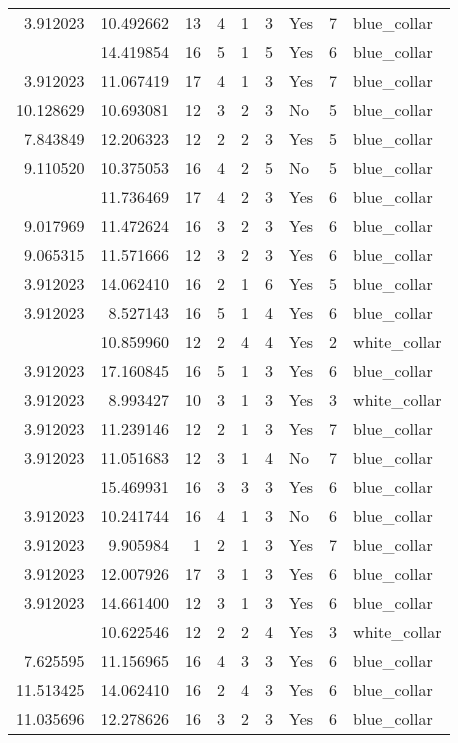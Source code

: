 \documentclass[
]{article}
\begin{document}
\begin{longtable}[t]{rrrrrllrl}
3.912023 & 10.492662 & 13 & 4 & 1 & 3 & Yes & 7 & blue\_collar\\
\addlinespace
3.912023 & 14.419854 & 16 & 5 & 1 & 5 & Yes & 6 & blue\_collar\\
3.912023 & 11.067419 & 17 & 4 & 1 & 3 & Yes & 7 & blue\_collar\\
10.128629 & 10.693081 & 12 & 3 & 2 & 3 & No & 5 & blue\_collar\\
7.843849 & 12.206323 & 12 & 2 & 2 & 3 & Yes & 5 & blue\_collar\\
9.110520 & 10.375053 & 16 & 4 & 2 & 5 & No & 5 & blue\_collar\\
\addlinespace
8.022897 & 11.736469 & 17 & 4 & 2 & 3 & Yes & 6 & blue\_collar\\
9.017969 & 11.472624 & 16 & 3 & 2 & 3 & Yes & 6 & blue\_collar\\
9.065315 & 11.571666 & 12 & 3 & 2 & 3 & Yes & 6 & blue\_collar\\
3.912023 & 14.062410 & 16 & 2 & 1 & 6 & Yes & 5 & blue\_collar\\
3.912023 & 8.527143 & 16 & 5 & 1 & 4 & Yes & 6 & blue\_collar\\
\addlinespace
7.207860 & 10.859960 & 12 & 2 & 4 & 4 & Yes & 2 & white\_collar\\
3.912023 & 17.160845 & 16 & 5 & 1 & 3 & Yes & 6 & blue\_collar\\
3.912023 & 8.993427 & 10 & 3 & 1 & 3 & Yes & 3 & white\_collar\\
3.912023 & 11.239146 & 12 & 2 & 1 & 3 & Yes & 7 & blue\_collar\\
3.912023 & 11.051683 & 12 & 3 & 1 & 4 & No & 7 & blue\_collar\\
\addlinespace
12.657307 & 15.469931 & 16 & 3 & 3 & 3 & Yes & 6 & blue\_collar\\
3.912023 & 10.241744 & 16 & 4 & 1 & 3 & No & 6 & blue\_collar\\
3.912023 & 9.905984 & 1 & 2 & 1 & 3 & Yes & 7 & blue\_collar\\
3.912023 & 12.007926 & 17 & 3 & 1 & 3 & Yes & 6 & blue\_collar\\
3.912023 & 14.661400 & 12 & 3 & 1 & 3 & Yes & 6 & blue\_collar\\
\addlinespace
4.094345 & 10.622546 & 12 & 2 & 2 & 4 & Yes & 3 & white\_collar\\
7.625595 & 11.156965 & 16 & 4 & 3 & 3 & Yes & 6 & blue\_collar\\
11.513425 & 14.062410 & 16 & 2 & 4 & 3 & Yes & 6 & blue\_collar\\
11.035696 & 12.278626 & 16 & 3 & 2 & 3 & Yes & 6 & blue\_collar\\

\end{longtable}
\end{document}
